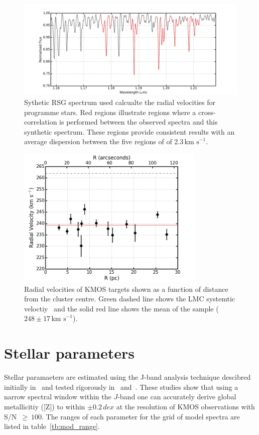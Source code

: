 \documentclass[useAMS,usenatbib]{mn2e}
\def\kms{$\mbox{km s}^{-1}$}
\begin{document}
\begin{figure}
 \includegraphics[width=18.0cm]{NGC2100-rv-regions}
 \caption{Sythetic RSG spectrum used calcualte the radial velocities for programme stars.
 Red regions illustrate regions where a cross-correlation is performed between the observed spectra and this synthetic spectrum.
 These regions provide consistent results with an average dispersion between the five regions of of 2.3\,\kms.
\label{fig:rv-regions}
          }
\end{figure}


\begin{figure}
 \includegraphics[width=9.0cm]{NGC2100-rv-v4}
 \caption{Radial velocities of KMOS targets shown as a function of distance from the cluster centre.
 Green dashed line shows the LMC systemtic veloctiy~\citep[$262.2\pm3.4$\,\kms;][]{2012AJ....144....4M}
 and the solid red line shows the mean of the sample ($248\pm17\,$\kms).
\label{fig:rvs}
          }
\end{figure}

\section{Stellar parameters} %
\label{sec:stellar_parameters}

Stellar paramaeters are estimated using the J-band analysis technique descibred initially in~\cite{2010MNRAS.407.1203D}
and tested rigorously in~\cite{2014ApJ...788...58G} and~\cite{2015ApJ...806...21D}.
These studies show that using a narrow spectral window within the $J$-band one can accurately derive global metallicitiy ([Z]) to within
$\pm0.2\,dex$ at the resolution of KMOS observations with S/N~$\ge~100$.
The ranges of each parameter for the grid of model spectra are listed in table~\ref{tb:mod_range}.
\end{document}
